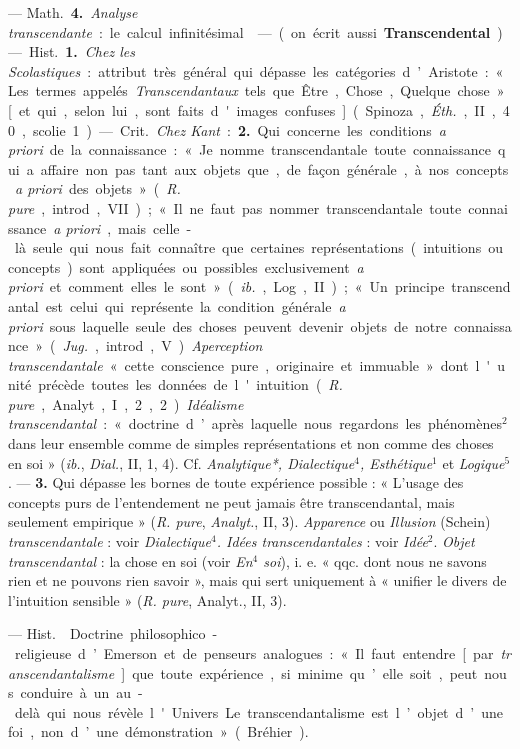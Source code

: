 \begin{itemize}[leftmargin=1cm, label=, itemsep=1pt]
— \si{Math.} {\bf 4.} {\it Analyse transcendante} : le calcul infinitésimal.

 — (on écrit aussi {\bf Transcendental}) — \si{Hist.}
{\bf 1.} {\it Chez les Scolastiques} : attribut très général qui dépasse les
catégories d’Aristote : « Les termes appelés {\it Transcendantaux} tels que
Être, Chose, Quelque chose » [et qui, selon lui, sont faits d'images
confuses] (Spinoza, {\it Éth.}, II, 40, scolie 1).

— \si{Crit.} {\it Chez Kant} : {\bf 2.} Qui concerne les conditions {\it a
priori} de la connaissance : « Je nomme transcendantale toute connaissance
qui a affaire non pas tant aux objets que, de façon générale, à nos concepts
{\it a priori} des objets » ({\it R. pure}, introd., VII) ; « Il ne faut pas
nommer transcendantale toute connaissance {\it a priori}, mais celle-là seule
qui nous fait connaître que certaines représentations (intuitions ou
concepts) sont appliquées ou possibles exclusivement {\it a priori} et
comment elles le sont » ({\it ib.}, Log., II) ; « Un principe transcendantal
est celui qui représente la condition générale {\it a priori} sous laquelle
seule des choses peuvent devenir objets de notre connaissance » ({\it Jug.},
introd., V). {\it Aperception transcendantale} « cette conscience pure,
originaire et immuable » dont l'unité précède toutes les données de
l'intuition ({\it R. pure}, Analyt., I, 2, 2). {\it Idéalisme
transcendantal} : « doctrine d’après laquelle nous regardons les
phénomènes$^2$ dans leur ensemble comme de simples représentations et non
comme des choses en soi » ({\it ib.}, {\it Dial.}, II, 1, 4). Cf. {\it
Analytique*, Dialectique$^4$, Esthétique$^1$} et {\it Logique}$^5$. —
{\bf 3.} Qui dépasse les bornes de toute expérience possible : « L'usage
des concepts purs de l’entendement ne peut jamais être transcendantal, mais
seulement empirique » ({\it R. pure}, {\it Analyt.}, II, 3). {\it Apparence}
ou {\it Illusion} (Schein) {\it transcendantale} : voir {\it Dialectique$^4$.
Idées transcendantales} : voir {\it Idée}$^2$. {\it Objet transcendantal} :
la chose en soi (voir {\it En$^4$ soi}), i. e. « qqc. dont nous ne savons
rien et ne pouvons rien savoir », mais qui sert uniquement à « unifier le
divers de l'intuition sensible » ({\it R. pure}, Analyt., II, 3).

 — \si{Hist.}  Doctrine
philosophico-religieuse d’Emerson et de penseurs analogues : « Il faut
entendre [par {\it transcendantalisme}] que toute expérience, si minime
qu’elle soit, peut nous conduire à un au-delà qui nous révèle l'Univers... Le
transcendantalisme est l’objet d’une foi, non d’une démonstration » (Bréhier).


\end{itemize}
